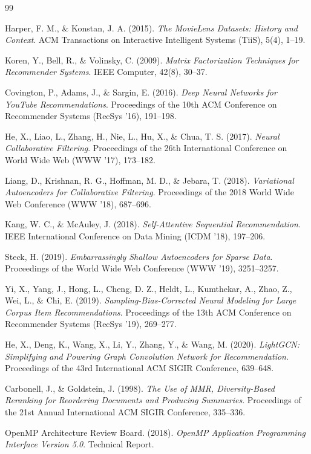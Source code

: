 \documentclass[a4paper,11pt]{article}
\begin{document}
\begin{thebibliography}{99}
\small
\setlength{\itemsep}{2pt}
\setlength{\parskip}{0pt}

Harper, F. M., \& Konstan, J. A. (2015). \textit{The MovieLens Datasets: History and Context}. ACM Transactions on Interactive Intelligent Systems (TiiS), 5(4), 1--19.

Koren, Y., Bell, R., \& Volinsky, C. (2009). \textit{Matrix Factorization Techniques for Recommender Systems}. IEEE Computer, 42(8), 30--37.

Covington, P., Adams, J., \& Sargin, E. (2016). \textit{Deep Neural Networks for YouTube Recommendations}. Proceedings of the 10th ACM Conference on Recommender Systems (RecSys '16), 191--198.

He, X., Liao, L., Zhang, H., Nie, L., Hu, X., \& Chua, T. S. (2017). \textit{Neural Collaborative Filtering}. Proceedings of the 26th International Conference on World Wide Web (WWW '17), 173--182.

Liang, D., Krishnan, R. G., Hoffman, M. D., \& Jebara, T. (2018). \textit{Variational Autoencoders for Collaborative Filtering}. Proceedings of the 2018 World Wide Web Conference (WWW '18), 687--696.

Kang, W. C., \& McAuley, J. (2018). \textit{Self-Attentive Sequential Recommendation}. IEEE International Conference on Data Mining (ICDM '18), 197--206.

Steck, H. (2019). \textit{Embarrassingly Shallow Autoencoders for Sparse Data}. Proceedings of the World Wide Web Conference (WWW '19), 3251--3257.

Yi, X., Yang, J., Hong, L., Cheng, D. Z., Heldt, L., Kumthekar, A., Zhao, Z., Wei, L., \& Chi, E. (2019). \textit{Sampling-Bias-Corrected Neural Modeling for Large Corpus Item Recommendations}. Proceedings of the 13th ACM Conference on Recommender Systems (RecSys '19), 269--277.

He, X., Deng, K., Wang, X., Li, Y., Zhang, Y., \& Wang, M. (2020). \textit{LightGCN: Simplifying and Powering Graph Convolution Network for Recommendation}. Proceedings of the 43rd International ACM SIGIR Conference, 639--648.

Carbonell, J., \& Goldstein, J. (1998). \textit{The Use of MMR, Diversity-Based Reranking for Reordering Documents and Producing Summaries}. Proceedings of the 21st Annual International ACM SIGIR Conference, 335--336.

OpenMP Architecture Review Board. (2018). \textit{OpenMP Application Programming Interface Version 5.0}. Technical Report.

\end{thebibliography}
\end{document}
